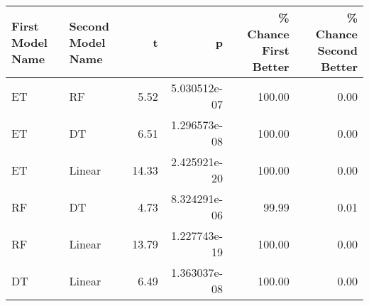 \begin{tabular}{llrrrr}
\toprule
First Model Name & Second Model Name &     t &            p &  \% Chance First Better &  \% Chance Second Better \\
\midrule
              ET &                RF &  5.52 & 5.030512e-07 &                 100.00 &                    0.00 \\
              ET &                DT &  6.51 & 1.296573e-08 &                 100.00 &                    0.00 \\
              ET &            Linear & 14.33 & 2.425921e-20 &                 100.00 &                    0.00 \\
              RF &                DT &  4.73 & 8.324291e-06 &                  99.99 &                    0.01 \\
              RF &            Linear & 13.79 & 1.227743e-19 &                 100.00 &                    0.00 \\
              DT &            Linear &  6.49 & 1.363037e-08 &                 100.00 &                    0.00 \\
\bottomrule
\end{tabular}
